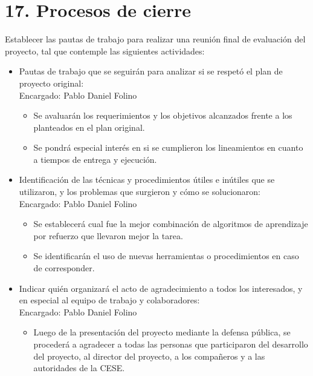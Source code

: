 \documentclass[11pt]{charter}
\begin{document}
\vspace{40mm}


\section{17. Procesos de cierre}    
\label{sec:cierre}

Establecer las pautas de trabajo para realizar una reunión final de evaluación del proyecto, tal que contemple las siguientes actividades:

\begin{itemize}
\item Pautas de trabajo que se seguirán para analizar si se respetó
el plan de proyecto original:\\
Encargado: Pablo Daniel Folino
	\begin{itemize}
	\item Se avaluarán los requerimientos y los objetivos alcanzados frente a los planteados en el plan original.
	\item Se pondrá especial interés en si se cumplieron los lineamientos en cuanto a tiempos de entrega y ejecución.
	\end{itemize}	
\item Identificación de las técnicas y procedimientos útiles e inútiles que se utilizaron, y los problemas que surgieron y cómo se solucionaron:\\
Encargado: Pablo Daniel Folino
	\begin{itemize}
	\item Se establecerá cual fue la mejor combinación de algoritmos de aprendizaje por refuerzo que llevaron mejor la tarea.
	\item Se identificarán el uso de nuevas herramientas o procedimientos en caso de corresponder.
	\end{itemize}
\item Indicar quién organizará el acto de agradecimiento a todos los interesados, y en especial al equipo de trabajo y colaboradores:\\
Encargado: Pablo Daniel Folino
	\begin{itemize}
	\item Luego de la presentación del proyecto mediante la defensa
	pública, se procederá a agradecer a todas las personas que participaron del desarrollo del proyecto, al director del proyecto, a los compañeros y a las autoridades de la CESE.
	\end{itemize}
\end{itemize}

\end{document}
